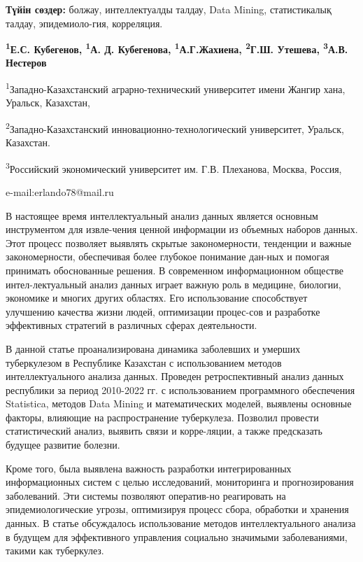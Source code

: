 {\bfseries Түйін сөздер:} болжау, интеллектуалды талдау, Data Mining,
статистикалық талдау, эпидемиоло-гия, корреляция.


\begin{center}
{\bfseries \textsuperscript{1}Е.С. Кубегенов\envelope,
\textsuperscript{1}А. Д. Кубегенова, \textsuperscript{1}А.Г.Жахиена,
\textsuperscript{2}Г.Ш. Утешева, \textsuperscript{3}А.В. Нестеров}

\textsuperscript{1}Западно-Казахстанский аграрно-технический университет
имени Жангир хана, Уральск, Казахстан,

\textsuperscript{2}Западно-Казахстанский инновационно-технологический
университет, Уральск, Казахстан.

\textsuperscript{3}Российский экономический университет им. Г.В.
Плеханова, Москва, Россия,

e-mail:erlando78@mail.ru
\end{center}

В настоящее время интеллектуальный анализ данных является основным
инструментом для извле-чения ценной информации из объемных наборов
данных. Этот процесс позволяет выявлять скрытые закономерности,
тенденции и важные закономерности, обеспечивая более глубокое понимание
дан-ных и помогая принимать обоснованные решения. В современном
информационном обществе интел-лектуальный анализ данных играет важную
роль в медицине, биологии, экономике и многих других областях. Его
использование способствует улучшению качества жизни людей, оптимизации
процес-сов и разработке эффективных стратегий в различных сферах
деятельности.

В данной статье проанализирована динамика заболевших и умерших
туберкулезом в Республике Казахстан с использованием методов
интеллектуального анализа данных. Проведен ретроспективный анализ данных
республики за период 2010-2022 гг. с использованием программного
обеспечения Statistica, методов Data Mining и математических моделей,
выявлены основные факторы, влияющие на распространение туберкулеза.
Позволил провести статистический анализ, выявить связи и корре-ляции, а
также предсказать будущее развитие болезни.

Кроме того, была выявлена важность разработки интегрированных
информационных систем с целью исследований, мониторинга и
прогнозирования заболеваний. Эти системы позволяют оператив-но
реагировать на эпидемиологические угрозы, оптимизируя процесс сбора,
обработки и хранения данных. В статье обсуждалось использование методов
интеллектуального анализа в будущем для эффективного управления
социально значимыми заболеваниями, такими как туберкулез.

